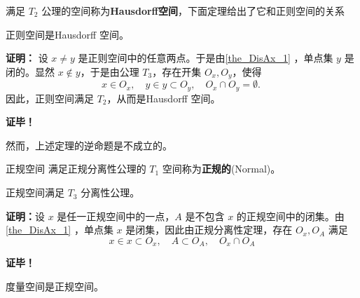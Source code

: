 满足 $T_2$ 公理的空间称为\textbf{Hausdorff空间}，下面定理给出了它和正则空间的关系
\begin{theorem}{}
正则空间是Hausdorff 空间。
\end{theorem}
\textbf{证明：}
设 $x\neq y$ 是正则空间中的任意两点。于是由\autoref{the_DisAx_1} ，单点集 $y$ 是闭的。显然 $x\notin y$，于是由公理 $T_3$，存在开集 $O_x,O_y$，使得
\begin{equation}
x\in O_x, \quad y\in y\subset O_y, \quad O_x\cap O_y=\emptyset.~
\end{equation}
因此，正则空间满足 $T_2$，从而是Hausdorff 空间。

\textbf{证毕！}

然而，上述定理的逆命题是不成立的。


\begin{definition}{正规空间}
满足正规分离性公理的 $T_1$ 空间称为\textbf{正规的}(Normal)。
\end{definition}

\begin{theorem}{}
正规空间满足 $T_3$ 分离性公理。
\end{theorem}

\textbf{证明：}设 $x$ 是任一正规空间中的一点，$A$ 是不包含 $x$ 的正规空间中的闭集。由\autoref{the_DisAx_1} ，单点集 $x$ 是闭集，因此由正规分离性定理，存在 $O_x,O_A$ 满足
\begin{equation}
x\in x\subset O_x, \quad A\subset O_A,\quad O_x\cap O_A 
\end{equation}



\textbf{证毕！}

\begin{theorem}{}
度量空间是正规空间。
\end{theorem}




